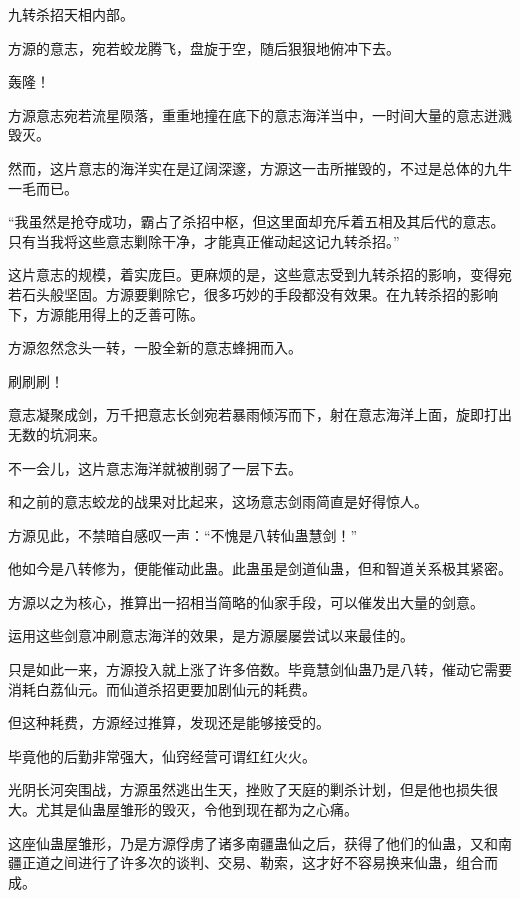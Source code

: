 
\begin{this_body}



九转杀招天相内部。

方源的意志，宛若蛟龙腾飞，盘旋于空，随后狠狠地俯冲下去。

轰隆！

方源意志宛若流星陨落，重重地撞在底下的意志海洋当中，一时间大量的意志迸溅毁灭。

然而，这片意志的海洋实在是辽阔深邃，方源这一击所摧毁的，不过是总体的九牛一毛而已。

“我虽然是抢夺成功，霸占了杀招中枢，但这里面却充斥着五相及其后代的意志。只有当我将这些意志剿除干净，才能真正催动起这记九转杀招。”

这片意志的规模，着实庞巨。更麻烦的是，这些意志受到九转杀招的影响，变得宛若石头般坚固。方源要剿除它，很多巧妙的手段都没有效果。在九转杀招的影响下，方源能用得上的乏善可陈。

方源忽然念头一转，一股全新的意志蜂拥而入。

刷刷刷！

意志凝聚成剑，万千把意志长剑宛若暴雨倾泻而下，射在意志海洋上面，旋即打出无数的坑洞来。

不一会儿，这片意志海洋就被削弱了一层下去。

和之前的意志蛟龙的战果对比起来，这场意志剑雨简直是好得惊人。

方源见此，不禁暗自感叹一声：“不愧是八转仙蛊慧剑！”

他如今是八转修为，便能催动此蛊。此蛊虽是剑道仙蛊，但和智道关系极其紧密。

方源以之为核心，推算出一招相当简略的仙家手段，可以催发出大量的剑意。

运用这些剑意冲刷意志海洋的效果，是方源屡屡尝试以来最佳的。

只是如此一来，方源投入就上涨了许多倍数。毕竟慧剑仙蛊乃是八转，催动它需要消耗白荔仙元。而仙道杀招更要加剧仙元的耗费。

但这种耗费，方源经过推算，发现还是能够接受的。

毕竟他的后勤非常强大，仙窍经营可谓红红火火。

光阴长河突围战，方源虽然逃出生天，挫败了天庭的剿杀计划，但是他也损失很大。尤其是仙蛊屋雏形的毁灭，令他到现在都为之心痛。

这座仙蛊屋雏形，乃是方源俘虏了诸多南疆蛊仙之后，获得了他们的仙蛊，又和南疆正道之间进行了许多次的谈判、交易、勒索，这才好不容易换来仙蛊，组合而成。


\end{this_body}
